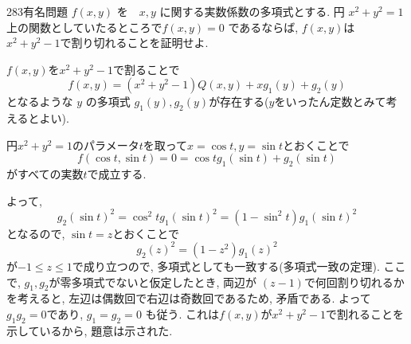 \begin{thm}{283}{}{有名問題}
$f(x,y)$ を　$x,y$ に関する実数係数の多項式とする. 円 $x^2 + y^2 = 1$ 上の関数としていたるところで$f(x,y) = 0$ であるならば, $f(x,y)$は$x^2 + y^2 - 1$で割り切れることを証明せよ. 
\end{thm}

$f(x,y)$を$x^2 + y^2 - 1$で割ることで
$$
f(x,y) = (x^2 + y^2 - 1)Q(x,y) + xg_1(y) +  g_2(y)
$$
となるような $y$ の多項式 $g_1(y), g_2(y)$が存在する($y$をいったん定数とみて考えるとよい).

円$x^2 + y^2 = 1$のパラメータ$t$を取って$x=\cos{t}, y=\sin{t}$とおくことで
$$
f(\cos{t}, \sin{t}) = 0 = \cos{t}g_1(\sin{t}) + g_2(\sin{t})
$$ 
がすべての実数$t$で成立する. 

よって, 
$$
g_2(\sin{t})^2 = \cos^{2}{t}g_1(\sin{t})^2 = (1-\sin^{2}{t})g_1(\sin{t})^2 
$$
となるので, $\sin{t} = z$とおくことで
$$
g_2(z)^2 = (1-z^2)g_1(z)^2
$$
が$-1\leq z\leq 1$で成り立つので, 多項式としても一致する(多項式一致の定理). ここで, $g_1, g_2$が零多項式でないと仮定したとき, 両辺が $(z-1)$で何回割り切れるかを考えると, 左辺は偶数回で右辺は奇数回であるため, 矛盾である. よって$g_1g_2 = 0$であり, $g_1 = g_2 = 0$ も従う. これは$f(x,y)$が$x^2 + y^2 - 1$で割れることを示しているから, 題意は示された. 